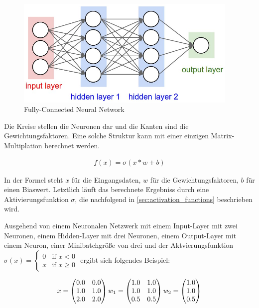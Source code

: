 \begin{figure}[H]
	\centering
	\includegraphics[width=0.95\textwidth]{resources/content/fully_connected.jpg}
	\caption{Fully-Connected Neural Network \cite{fully_connected_img}}
	\label{img:fully_connected}
\end{figure}

Die Kreise stellen die Neuronen dar und die Kanten sind die Gewichtungsfaktoren.
Eine solche Struktur kann mit einer einzigen Matrix-Multiplation berechnet werden.

\begin{align}
	f(x) = \sigma(x * w + b)
\end{align}

In der Formel steht $ x $ für die Eingangsdaten, $ w $ für die Gewichtungsfaktoren, $ b $ für einen Biaswert. Letztlich läuft das berechnete Ergebniss durch eine Aktivierungsfunktion $ \sigma $, die nachfolgend in \ref{sec:activation_functions} beschrieben wird.

Ausgehend von einem Neuronalen Netzwerk mit einem Input-Layer mit zwei Neuronen, einem Hidden-Layer mit drei Neuronen, einem Output-Layer mit einem Neuron, einer Minibatchgröße von drei und der Aktvierungsfunktion $ \sigma(x) = {\begin{cases}0&{\text{if }}x<0\\x&{\text{if }}x\geq 0\end{cases}} $ ergibt sich folgendes Beispiel:

\begin{equation}
	\vspace{5pt}
	x = \begin{pmatrix} 
		0.0 & 0.0 \\
		1.0 & 1.0 \\ 
		2.0 & 2.0
	\end{pmatrix}
	\vspace{5pt}
	w_{1} = \begin{pmatrix} 
		1.0 & 1.0 \\
		1.0 & 1.0 \\ 
		0.5 & 0.5
	\end{pmatrix}
	\vspace{5pt}
	w_{2} = \begin{pmatrix} 
		1.0 \\
		1.0 \\ 
		0.5
	\end{pmatrix}
\end{equation}


